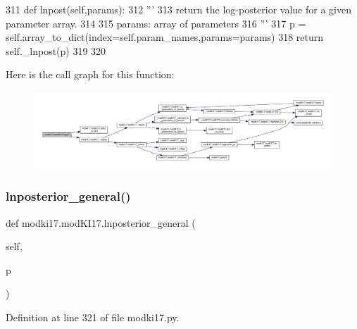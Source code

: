 \begin{DoxyCode}
311     \textcolor{keyword}{def }lnpost(self,params):
312         \textcolor{stringliteral}{'''}
313 \textcolor{stringliteral}{        return the log-posterior value for a given parameter array.}
314 \textcolor{stringliteral}{        }
315 \textcolor{stringliteral}{        params: array of parameters}
316 \textcolor{stringliteral}{        '''}
317         p = self.array\_to\_dict(index=self.param\_names,params=params)
318         \textcolor{keywordflow}{return} self.\_lnpost(p)
319     
320     
\end{DoxyCode}
Here is the call graph for this function\+:\nopagebreak
\begin{figure}[H]
\begin{center}
\leavevmode
\includegraphics[width=350pt]{df/da3/classmodki17_1_1modKI17_aa8e6d0ca906f1ab77cfc64f7ec15f327_cgraph}
\end{center}
\end{figure}
\mbox{\label{classmodki17_1_1modKI17_ae26b505fa65c5f8b3c589a20f849879a}} 
\subsubsection{\texorpdfstring{lnposterior\+\_\+general()}{lnposterior\_general()}}
{\footnotesize\ttfamily def modki17.\+mod\+K\+I17.\+lnposterior\+\_\+general (\begin{DoxyParamCaption}\item[{}]{self,  }\item[{}]{p }\end{DoxyParamCaption})}



Definition at line 321 of file modki17.\+py.



